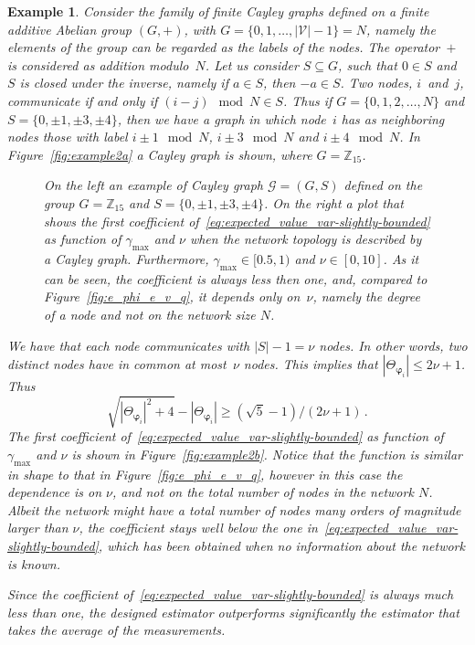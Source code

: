 \documentclass[a4paper,notitlepage,onecolumn]{article}
\def\Z{\mathds{Z}}
\def\varphib{\boldsymbol{\varphi}}
\newtheorem{example}[theorem]{Example}
\numberwithin{equation}{section}
\begin{document}
\begin{example}
Consider the family of finite Cayley graphs defined on a finite
additive Abelian group $(G,+)$, with
$G=\{0,1,\dots,|\mathcal{V}|-1\} = N$, namely the elements of the
group can be regarded as the labels of the nodes. The operator~$+$
is considered as addition modulo~$N$. Let us consider $S \subseteq
G$, such that $0\in S$ and $S$ is closed under the inverse, namely
if $a \in S$, then $-a \in S$. Two nodes, $i$~and~$j$, communicate
if and only if $(i-j) \mod N \in S$. Thus if $G =
\{0,1,2,\dots,N\}$ and $S = \{0,\pm 1,\pm 3, \pm 4\}$, then we
have a graph in which node~$i$ has as neighboring nodes those with
label $i\pm 1 \mod N$, $i \pm 3 \mod N$ and $i \pm 4 \mod N$. In
Figure~\ref{fig:example2a} a Cayley graph is shown, where $G =
\Z_{15}$.

\begin{figure}
    \centering
    \hspace*{2cm}
    \caption{On the left an example of Cayley graph $\mathcal{G} = (G,S)$
    defined on the group $G = \Z_{15}$ and $S=\{0,\pm 1, \pm 3, \pm 4\}$. On
    the right a plot that shows the first coefficient
    of~\eqref{eq:expected_value_var-slightly-bounded} as function of $\gamma_{\max}$ and $\nu$ when the network topology is described by a Cayley graph.
    Furthermore, $\gamma_{\max} \in [0.5,1)$ and $\nu \in [0,10]$. As it can be seen, the coefficient is always less then one, and,
    compared to Figure~\ref{fig:e_phi_e_v_q}, it depends only on~$\nu$, namely the degree of a node and not on the network size $N$.}
    \label{fig:example2}
\end{figure}


We have that each node communicates with $|S|-1= \nu$ nodes. In
other words, two distinct nodes have in common at most~$\nu$
nodes. This implies that $|\Theta_{\varphib_i}|\leq 2\nu+1$. Thus
$$
   \sqrt{|\Theta_{\varphib_i}|^2+4} - |\Theta_{\varphib_i}| \geq (\sqrt{5}-1) /(2\nu+1)\,.
$$
The first coefficient
of~\eqref{eq:expected_value_var-slightly-bounded} as function of
$\gamma_{\max}$ and $\nu$ is shown in Figure~\ref{fig:example2b}.
Notice that the function is similar in shape to that in
Figure~\ref{fig:e_phi_e_v_q}, however in this case the dependence
is on $\nu$, and not on the total number of nodes in the network
$N$. Albeit the network might have a total number of nodes many
orders of magnitude larger than $\nu$, the coefficient stays well
below the one in~\eqref{eq:expected_value_var-slightly-bounded},
which has been obtained when no information about the network is
known.

Since the coefficient
of~\eqref{eq:expected_value_var-slightly-bounded} is always much
less than one, the designed estimator outperforms significantly
the estimator that takes the average of the measurements.
\end{example}
\end{document}
